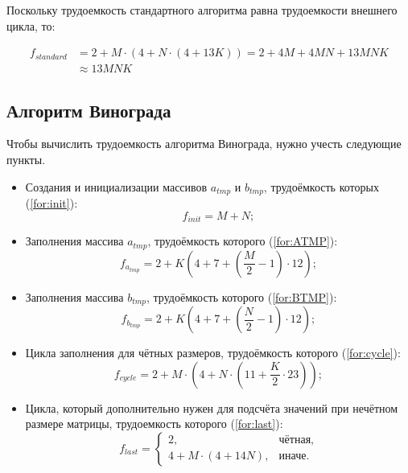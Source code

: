 Поскольку трудоемкость стандартного алгоритма равна трудоемкости внешнего цикла, то:

\begin{align}
	\label{for:standard}
	f_{standard} &= 2 + M \cdot (4 + N \cdot (4 + 13K)) = 2 + 4M + 4MN + 13MNK\\ &\approx 13MNK
\end{align}


\subsection{Алгоритм Винограда}

Чтобы вычислить трудоемкость алгоритма Винограда, нужно учесть следующие пункты.

\begin{itemize}
	\item Создания и инициализации массивов $a_{tmp}$ и $b_{tmp}$, трудоёмкость которых (\ref{for:init}):
	\begin{equation}
		\label{for:init}
		f_{init} = M + N;
	\end{equation}
	
	\item Заполнения массива $a_{tmp}$, трудоёмкость которого (\ref{for:ATMP}):
	\begin{equation}

			\label{for:ATMP}
		f_{a_{tmp}} = 2 + K (4 + 7 +  (\frac{M}{2} - 1)  \cdot 12);
	\end{equation}
	
	\item Заполнения массива $b_{tmp}$, трудоёмкость которого (\ref{for:BTMP}):
	\begin{equation}
			\label{for:BTMP}
		f_{b_{tmp}} = 2 + K (4 + 7 + (\frac{N}{2} - 1) \cdot 12);
	\end{equation}

	
	\item Цикла заполнения для чётных размеров, трудоёмкость которого (\ref{for:cycle}):
	\begin{equation}
		\label{sfor:cycle}
		f_{cycle} = 2 + M \cdot (4 + N \cdot (11 + \frac{K}{2} \cdot 23));
	\end{equation}
	
	\item Цикла, который дополнительно нужен для подсчёта значений при нечётном размере матрицы, трудоемкость которого (\ref{for:last}):
	\begin{equation}
		\label{for:last}
		f_{last} = \begin{cases}
			2, & \text{чётная,}\\
			4 + M \cdot (4 + 14N), & \text{иначе.}
		\end{cases}
	\end{equation}
\end{itemize}

